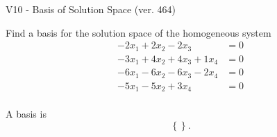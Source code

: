 \begin{exercise}
  \begin{exerciseTitle}V10 - Basis of Solution Space (ver. 464)\end{exerciseTitle}
  \begin{exerciseStatement}
    Find a basis for the solution space of the homogeneous system 
\begin{align*}
 -2 x_ 1 + 2 x_ 2 -2 x_ 3 &= 0  \\ 
  -3 x_ 1 + 4 x_ 2 + 4 x_ 3 + 1 x_ 4 &= 0  \\ 
  -6 x_ 1 -6 x_ 2 -6 x_ 3 -2 x_ 4 &= 0  \\ 
  -5 x_ 1 -5 x_ 2 + 3 x_ 4 &= 0  \\ 
 \end{align*}


 
  \end{exerciseStatement}

  \begin{exerciseAnswer}
   A basis is   
\[\left\{\right\}.\]

  


  \end{exerciseAnswer}
\end{exercise}